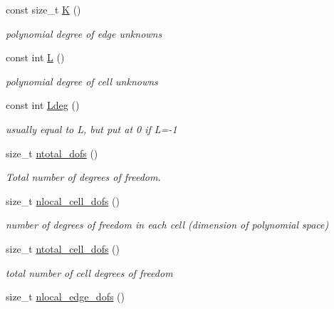 \begin{DoxyCompactItemize}
const size\+\_\+t \hyperlink{classHArDCore2D_1_1HybridCore_a74242d0a8b68fe5d9a35c6eb0effe3b2}{K} ()
\begin{DoxyCompactList}\small\item\em polynomial degree of edge unknowns \end{DoxyCompactList}\item 
\mbox{\label{classHArDCore2D_1_1HybridCore_af5aea2e23e91c582d8c8189a5bc7ae96}} 
const int \hyperlink{classHArDCore2D_1_1HybridCore_af5aea2e23e91c582d8c8189a5bc7ae96}{L} ()
\begin{DoxyCompactList}\small\item\em polynomial degree of cell unknowns \end{DoxyCompactList}\item 
\mbox{\label{classHArDCore2D_1_1HybridCore_abc772d1adc056fb4bf725f39c92edbb5}} 
const int \hyperlink{classHArDCore2D_1_1HybridCore_abc772d1adc056fb4bf725f39c92edbb5}{Ldeg} ()
\begin{DoxyCompactList}\small\item\em usually equal to L, but put at 0 if L=-\/1 \end{DoxyCompactList}\item 
size\+\_\+t \hyperlink{group__HybridCore_ga728e5b5aa3675a64e7dbc593ed9761f8}{ntotal\+\_\+dofs} ()
\begin{DoxyCompactList}\small\item\em Total number of degrees of freedom. \end{DoxyCompactList}\item 
size\+\_\+t \hyperlink{group__HybridCore_ga6faceb46cc896cd6d82a821828518730}{nlocal\+\_\+cell\+\_\+dofs} ()
\begin{DoxyCompactList}\small\item\em number of degrees of freedom in each cell (dimension of polynomial space) \end{DoxyCompactList}\item 
size\+\_\+t \hyperlink{group__HybridCore_gaf97e3efcc37ac51074c7136af3ca517b}{ntotal\+\_\+cell\+\_\+dofs} ()
\begin{DoxyCompactList}\small\item\em total number of cell degrees of freedom \end{DoxyCompactList}\item 
size\+\_\+t \hyperlink{group__HybridCore_ga6a45e5ff09d21b18874e1446cd9de9bc}{nlocal\+\_\+edge\+\_\+dofs} ()

\end{DoxyCompactItemize}
